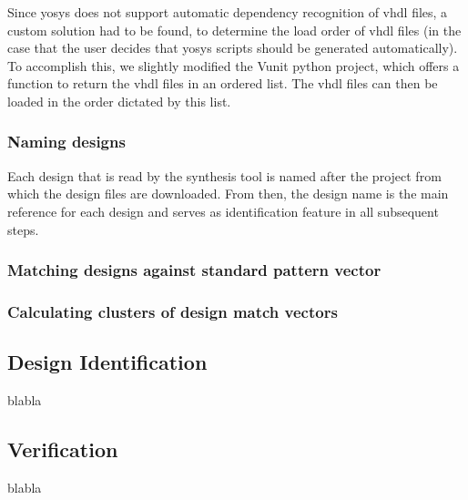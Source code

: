 Since yosys does not support automatic dependency recognition of vhdl files, a custom solution
had to be found, to determine the load order of vhdl files (in the case that the user decides
that yosys scripts should be generated automatically). To accomplish this, we slightly modified 
the Vunit python project, which offers a function to return the \gls{vhdl} 
files in an ordered list. The vhdl files can then be loaded in the order dictated by this list.  

\subsubsection{Naming designs} 
Each design that is read by the synthesis tool is named after the project from
which the design files are downloaded. From then, the design name is the main
reference for each design and serves as identification feature in all
subsequent steps.

\subsubsection{Matching designs against standard pattern vector}
\subsubsection{Calculating clusters of design match vectors}

\subsection{Design Identification}
blabla

\subsection{Verification}
blabla



